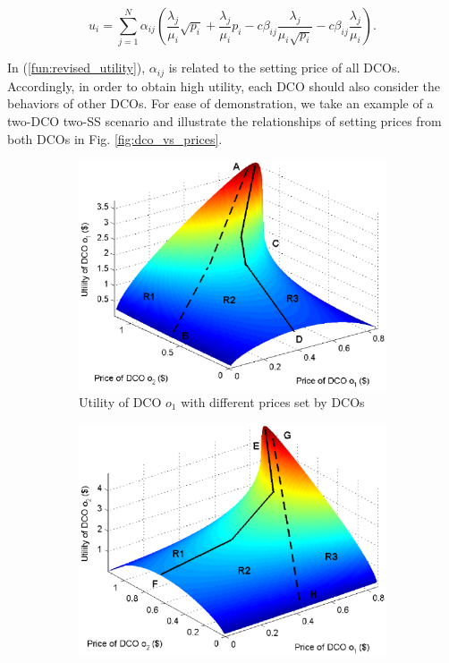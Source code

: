 \documentclass[twocolumn,10pt]{IEEEtran}
\begin{document}
\begin{equation}\label{fun:revised_utility}
    u_{i}= \sum\limits_{j = 1}^N {{\alpha _{ij}}\left( {\frac{{{\lambda _j}}}{{{\mu _i}}}\sqrt {{p_i}}  + \frac{{{\lambda _j}}}{{{\mu _i}}}{p_i} - c{\beta _{ij}}\frac{{{\lambda _j}}}{{{\mu _i}\sqrt {{p_i}} }} - c{\beta _{ij}}\frac{{{\lambda _j}}}{{{\mu _i}}}} \right)}.
\end{equation}

In (\ref{fun:revised_utility}), $\alpha _{ij}$ is related to the setting price of all DCOs. Accordingly, in order to obtain high utility, each DCO should also consider the behaviors of other DCOs. For ease of demonstration, we take an example of a two-DCO two-SS scenario and illustrate the relationships of setting prices from both DCOs in Fig. \ref{fig:dco_vs_prices}.


\begin{figure}[t]
    \begin{subfigure}[b]{0.5\textwidth}
    \centering
        \includegraphics[scale=0.5, bb=479 262 86 558]{show_utilityDCO1_vs_prices.eps}
        \caption{Utility of DCO $o_1$ with different prices set by DCOs}
        \label{fig:DCO 1}\vspace{0.5 cm}
    \end{subfigure}
    \begin{subfigure}[b]{0.5\textwidth}
        \centering
        \includegraphics[scale=0.5, bb=479 262 86 558]{show_utilityDCO2_vs_prices.eps}

\end{subfigure}
\end{figure}
\end{document}
